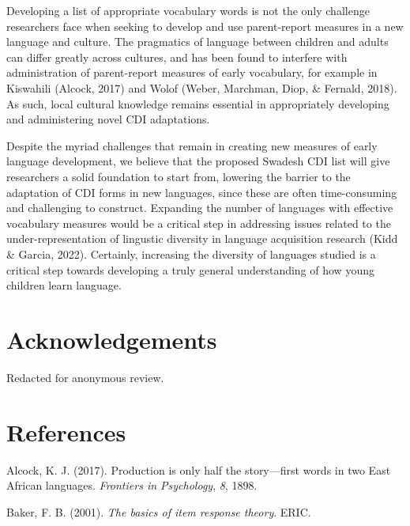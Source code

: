 \documentclass[10pt, letterpaper]{article}
\begin{document}
Developing a list of appropriate vocabulary words is not the only
challenge researchers face when seeking to develop and use parent-report
measures in a new language and culture. The pragmatics of language
between children and adults can differ greatly across cultures, and has
been found to interfere with administration of parent-report measures of
early vocabulary, for example in Kiswahili (Alcock, 2017) and Wolof
(Weber, Marchman, Diop, \& Fernald, 2018). As such, local cultural
knowledge remains essential in appropriately developing and
administering novel CDI adaptations.

Despite the myriad challenges that remain in creating new measures of
early language development, we believe that the proposed Swadesh CDI
list will give researchers a solid foundation to start from, lowering
the barrier to the adaptation of CDI forms in new languages, since these
are often time-consuming and challenging to construct. Expanding the
number of languages with effective vocabulary measures would be a
critical step in addressing issues related to the under-representation
of lingustic diversity in language acquisition research (Kidd \& Garcia,
2022). Certainly, increasing the diversity of languages studied is a
critical step towards developing a truly general understanding of how
young children learn language.

\hypertarget{acknowledgements}{%
\section{Acknowledgements}\label{acknowledgements}}

Redacted for anonymous review.

\hypertarget{references}{%
\section{References}\label{references}}

\setlength{\parindent}{-0.1in} 
\setlength{\leftskip}{0.125in}

\noindent

\hypertarget{refs}{}
\leavevmode{}%
Alcock, K. J. (2017). Production is only half the story---first words in
two {East African} languages. \emph{Frontiers in Psychology}, \emph{8},
1898.

\leavevmode{}%
Baker, F. B. (2001). \emph{The basics of item response theory}. ERIC.
\end{document}
